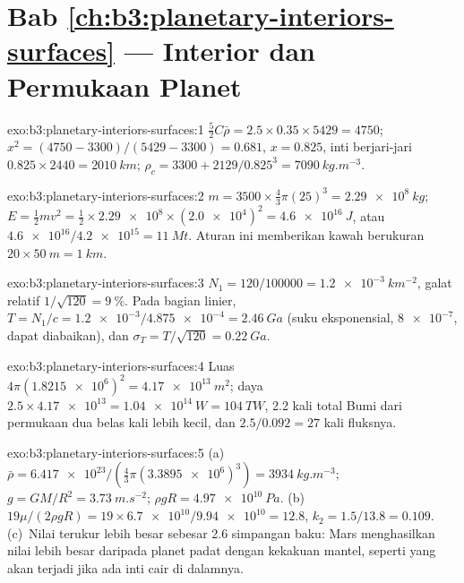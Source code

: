 \section*{Bab \ref{ch:b3:planetary-interiors-surfaces} --- Interior dan Permukaan Planet}

\begin{solution}{exo:b3:planetary-interiors-surfaces:1}
$\tfrac52C\bar\rho = 2.5\times0.35\times5429 = 4750$; $x^2 = (4750 -
3300)/(5429 - 3300) = 0.681$, $x = 0.825$, inti berjari-jari $0.825\times2440 =
\qty{2010}{km}$; $\rho_c = 3300 + 2129/0.825^3 = \qty{7090}{kg.m^{-3}}$.
\end{solution}

\begin{solution}{exo:b3:planetary-interiors-surfaces:2}
$m = 3500\times\tfrac43\pi(25)^3 = \qty{2.29e8}{kg}$; $E = \tfrac12 m v^2 =
\tfrac12\times\num{2.29e8}\times(\num{2.0e4})^2 = \qty{4.6e16}{J}$, atau
$\num{4.6e16}/\num{4.2e15} = \qty{11}{Mt}$. Aturan ini memberikan kawah berukuran
$20\times\qty{50}{m} = \qty{1}{km}$.
\end{solution}

\begin{solution}{exo:b3:planetary-interiors-surfaces:3}
$N_1 = 120/\num{100000} = \qty{1.2e-3}{km^{-2}}$, galat relatif $1/\sqrt{120}
= \qty{9}{\percent}$. Pada bagian linier, $T = N_1/c = \num{1.2e-3}/\num{4.875e-4}
= \qty{2.46}{Ga}$ (suku eksponensial, $\num{8e-7}$, dapat diabaikan), dan
$\sigma_T = T/\sqrt{120} = \qty{0.22}{Ga}$.
\end{solution}

\begin{solution}{exo:b3:planetary-interiors-surfaces:4}
Luas $4\pi(\num{1.8215e6})^2 = \qty{4.17e13}{m^2}$; daya $2.5\times
\num{4.17e13} = \qty{1.04e14}{W} = \qty{104}{TW}$, 2.2 kali total Bumi
dari permukaan dua belas kali lebih kecil, dan $2.5/0.092 = 27$ kali
fluksnya.
\end{solution}

\begin{solution}{exo:b3:planetary-interiors-surfaces:5}
(a)~$\bar\rho = \num{6.417e23}/(\tfrac43\pi(\num{3.3895e6})^3) =
\qty{3934}{kg.m^{-3}}$; $g = GM/R^2 = \qty{3.73}{m.s^{-2}}$; $\rho gR =
\qty{4.97e10}{Pa}$. (b)~$19\mu/(2\rho gR) = 19\times\num{6.7e10}/\num{9.94e10}
= 12.8$, $k_2 = 1.5/13.8 = 0.109$. (c)~Nilai terukur lebih besar sebesar
2.6 simpangan baku: Mars menghasilkan nilai lebih besar daripada planet padat dengan
kekakuan mantel, seperti yang akan terjadi jika ada inti cair di dalamnya.
\end{solution}

